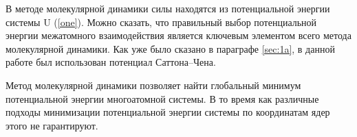 В методе молекулярной динамики силы находятся из потенциальной энергии системы
U (\ref{one}). Можно сказать, что правильный выбор потенциальной энергии
межатомного взаимодействия является ключевым элементом всего метода
молекулярной динамики. Как уже было сказано в параграфе \ref{sec:1a}, в данной
работе был использован потенциал Саттона--Чена.

Метод молекулярной динамики позволяет найти глобальный минимум потенциальной энергии
многоатомной системы. В то время как различные подходы минимизации потенциальной энергии
системы по координатам ядер этого не гарантируют.
